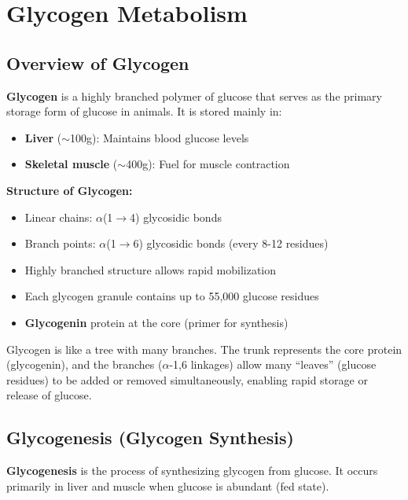 \section{Glycogen Metabolism}

\subsection{Overview of Glycogen}

\begin{definition}
\textbf{Glycogen} is a highly branched polymer of glucose that serves as the primary storage form of glucose in animals. It is stored mainly in:
\begin{itemize}
    \item \textbf{Liver} ($\sim$100g): Maintains blood glucose levels
    \item \textbf{Skeletal muscle} ($\sim$400g): Fuel for muscle contraction
\end{itemize}
\end{definition}

\textbf{Structure of Glycogen:}
\begin{itemize}
    \item Linear chains: $\alpha$(1$\rightarrow$4) glycosidic bonds
    \item Branch points: $\alpha$(1$\rightarrow$6) glycosidic bonds (every 8-12 residues)
    \item Highly branched structure allows rapid mobilization
    \item Each glycogen granule contains up to 55,000 glucose residues
    \item \textbf{Glycogenin} protein at the core (primer for synthesis)
\end{itemize}

\begin{analogy}
Glycogen is like a tree with many branches. The trunk represents the core protein (glycogenin), and the branches ($\alpha$-1,6 linkages) allow many ``leaves'' (glucose residues) to be added or removed simultaneously, enabling rapid storage or release of glucose.
\end{analogy}

\subsection{Glycogenesis (Glycogen Synthesis)}

\begin{definition}
\textbf{Glycogenesis} is the process of synthesizing glycogen from glucose. It occurs primarily in liver and muscle when glucose is abundant (fed state).
\end{definition}

